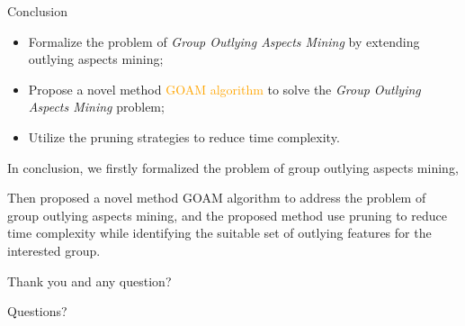 \documentclass[
 size=14pt,
 paper=smartboard,  %
 mode=present, 		%
 display=slides, 	%
 style=tuliplab,  	%
 pauseslide,
 fleqn,leqno]{powerdot}
\begin{document}
\begin{slide}[toc=,bm=]{Conclusion}
\begin{itemize}
\item
\smallskip
Formalize the problem of \emph{Group Outlying Aspects Mining} by
extending outlying aspects mining;

\item
\smallskip
Propose a novel method \textcolor{orange}{GOAM algorithm} to solve the
\emph{Group Outlying Aspects Mining} problem;

\item
\smallskip
Utilize the pruning strategies to reduce time complexity.

\end{itemize}

\begin{note}
In conclusion,
we firstly formalized the problem of
group outlying aspects mining,

Then proposed a novel method GOAM algorithm to address the problem of
group outlying aspects mining,
and the proposed method use pruning to reduce time complexity
while identifying the suitable set of outlying features for the interested group.

Thank you and any question?
\end{note}

\end{slide}


%
\begin{slide}[toc=,bm=]{Questions?}
\begin{center}
\begin{figure}
\end{figure}
\end{center}
\end{slide}
\end{document}
